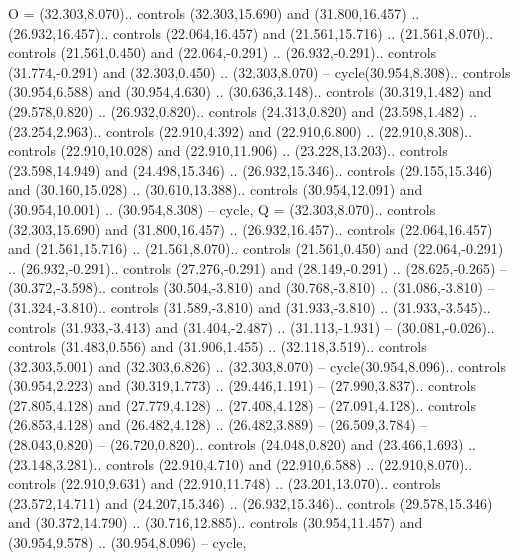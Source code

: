 {O} = {(32.303,8.070).. controls (32.303,15.690) and (31.800,16.457) .. (26.932,16.457).. controls (22.064,16.457) and (21.561,15.716) .. (21.561,8.070).. controls (21.561,0.450) and (22.064,-0.291) .. (26.932,-0.291).. controls (31.774,-0.291) and (32.303,0.450) .. (32.303,8.070) -- cycle(30.954,8.308).. controls (30.954,6.588) and (30.954,4.630) .. (30.636,3.148).. controls (30.319,1.482) and (29.578,0.820) .. (26.932,0.820).. controls (24.313,0.820) and (23.598,1.482) .. (23.254,2.963).. controls (22.910,4.392) and (22.910,6.800) .. (22.910,8.308).. controls (22.910,10.028) and (22.910,11.906) .. (23.228,13.203).. controls (23.598,14.949) and (24.498,15.346) .. (26.932,15.346).. controls (29.155,15.346) and (30.160,15.028) .. (30.610,13.388).. controls (30.954,12.091) and (30.954,10.001) .. (30.954,8.308) -- cycle},
{Q} = {(32.303,8.070).. controls (32.303,15.690) and (31.800,16.457) .. (26.932,16.457).. controls (22.064,16.457) and (21.561,15.716) .. (21.561,8.070).. controls (21.561,0.450) and (22.064,-0.291) .. (26.932,-0.291).. controls (27.276,-0.291) and (28.149,-0.291) .. (28.625,-0.265) -- (30.372,-3.598).. controls (30.504,-3.810) and (30.768,-3.810) .. (31.086,-3.810) -- (31.324,-3.810).. controls (31.589,-3.810) and (31.933,-3.810) .. (31.933,-3.545).. controls (31.933,-3.413) and (31.404,-2.487) .. (31.113,-1.931) -- (30.081,-0.026).. controls (31.483,0.556) and (31.906,1.455) .. (32.118,3.519).. controls (32.303,5.001) and (32.303,6.826) .. (32.303,8.070) -- cycle(30.954,8.096).. controls (30.954,2.223) and (30.319,1.773) .. (29.446,1.191) -- (27.990,3.837).. controls (27.805,4.128) and (27.779,4.128) .. (27.408,4.128) -- (27.091,4.128).. controls (26.853,4.128) and (26.482,4.128) .. (26.482,3.889) -- (26.509,3.784) -- (28.043,0.820) -- (26.720,0.820).. controls (24.048,0.820) and (23.466,1.693) .. (23.148,3.281).. controls (22.910,4.710) and (22.910,6.588) .. (22.910,8.070).. controls (22.910,9.631) and (22.910,11.748) .. (23.201,13.070).. controls (23.572,14.711) and (24.207,15.346) .. (26.932,15.346).. controls (29.578,15.346) and (30.372,14.790) .. (30.716,12.885).. controls (30.954,11.457) and (30.954,9.578) .. (30.954,8.096) -- cycle},
